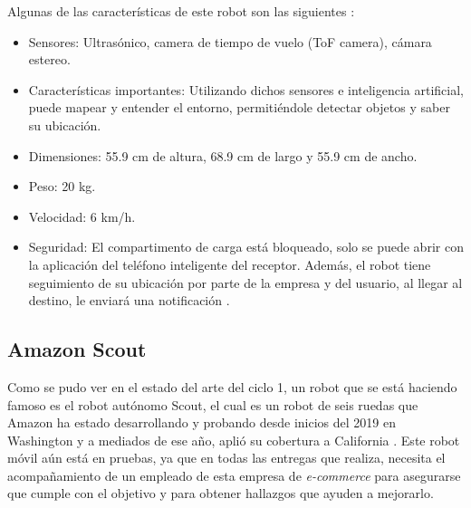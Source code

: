 Algunas de las características de este robot son las siguientes \cite{starship_feature}:

\begin{itemize}
\item Sensores: Ultrasónico, camera de tiempo de vuelo (ToF camera), cámara estereo.

\item Características importantes: Utilizando dichos sensores e inteligencia artificial, puede mapear y entender el entorno, permitiéndole detectar objetos y saber su ubicación.

\item Dimensiones: 55.9 cm de altura, 68.9 cm de largo y 55.9 cm de ancho.

\item Peso: 20 kg.

\item Velocidad: 6 km/h.

\item Seguridad: El compartimento de carga está bloqueado, solo se puede abrir con la aplicación del teléfono inteligente del receptor. Además, el robot tiene seguimiento de su ubicación por parte de la empresa y del usuario, al llegar al destino, le enviará una notificación \cite{starship}.
\end{itemize}

\subsection{Amazon Scout} 

Como se pudo ver en el estado del arte del ciclo 1, un robot que se está haciendo famoso es el robot autónomo Scout, el cual es un robot de seis ruedas que Amazon ha estado desarrollando y probando desde inicios del 2019 en Washington y a mediados de ese año, aplió su cobertura a California \cite{amazon_verge}. Este robot móvil aún está en pruebas, ya que en todas las entregas que realiza, necesita el acompañamiento de un empleado de esta empresa de \textit{e-commerce} para asegurarse que cumple con el objetivo y para obtener hallazgos que ayuden a mejorarlo.


